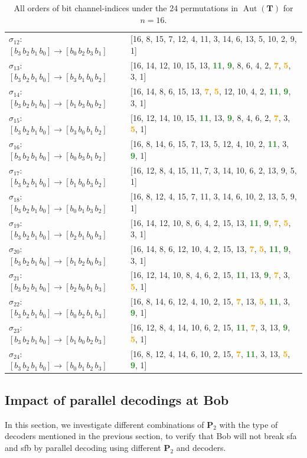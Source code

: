\documentclass[onecolumn]{IEEEtran} %
\newcommand{\bP}{\mathbf P}
\newcommand{\1}{\mathbbm{1}}
\DeclareMathOperator{\Aut}{Aut}
\theoremstyle{boldremark}
\newcommand{\bT}{\mathbf{T}}
\newcommand{\g}[1]{\textcolor{ForestGreen}{\textbf{#1}}}
\newcommand{\y}[1]{\textcolor{orange}{\textbf{#1}}}
\begin{document}
\begin{table}[h]
\begin{normalsize}
\begin{tabular}{ll}
$\sigma_{12}$: $[b_3\,b_2\,b_1\,b_0]\to[b_0\,b_2\,b_3\,b_1]$ & [16, 8, 15, 7, 12, 4, 11, 3, 14, 6, 13, 5, 10, 2, 9, 1]\\
$\sigma_{13}$: $[b_3\,b_2\,b_1\,b_0]\to[b_3\,b_1\,b_0\,b_2]$ & [16, 14, 12, 10, 15, 13, \g{11}, \g{9}, 8, 6, 4, 2, \y{7}, \y{5}, 3, 1]\\
$\sigma_{14}$: $[b_3\,b_2\,b_1\,b_0]\to[b_1\,b_3\,b_0\,b_2]$ & [16, 14, 8, 6, 15, 13, \y{7}, \y{5}, 12, 10, 4, 2, \g{11}, \g{9}, 3, 1]\\
$\sigma_{15}$: $[b_3\,b_2\,b_1\,b_0]\to[b_3\,b_0\,b_1\,b_2]$ & [16, 12, 14, 10, 15, \g{11}, 13, \g{9}, 8, 4, 6, 2, \y{7}, 3, \y{5}, 1]\\
$\sigma_{16}$: $[b_3\,b_2\,b_1\,b_0]\to[b_0\,b_3\,b_1\,b_2]$ & [16, 8, 14, 6, 15, 7, 13, 5, 12, 4, 10, 2, \g{11}, 3, \g{9}, 1]\\
$\sigma_{17}$: $[b_3\,b_2\,b_1\,b_0]\to[b_1\,b_0\,b_3\,b_2]$ & [16, 12, 8, 4, 15, 11, 7, 3, 14, 10, 6, 2, 13, 9, 5, 1]\\
$\sigma_{18}$: $[b_3\,b_2\,b_1\,b_0]\to[b_0\,b_1\,b_3\,b_2]$ & [16, 8, 12, 4, 15, 7, 11, 3, 14, 6, 10, 2, 13, 5, 9, 1]\\
$\sigma_{19}$: $[b_3\,b_2\,b_1\,b_0]\to[b_2\,b_1\,b_0\,b_3]$ & [16, 14, 12, 10, 8, 6, 4, 2, 15, 13, \g{11}, \g{9}, \y{7}, \y{5}, 3, 1]\\
$\sigma_{20}$: $[b_3\,b_2\,b_1\,b_0]\to[b_1\,b_2\,b_0\,b_3]$ & [16, 14, 8, 6, 12, 10, 4, 2, 15, 13, \y{7}, \y{5}, \g{11}, \g{9}, 3, 1]\\
$\sigma_{21}$: $[b_3\,b_2\,b_1\,b_0]\to[b_2\,b_0\,b_1\,b_3]$ & [16, 12, 14, 10, 8, 4, 6, 2, 15, \g{11}, 13, \g{9}, \y{7}, 3, \y{5}, 1]\\
$\sigma_{22}$: $[b_3\,b_2\,b_1\,b_0]\to[b_0\,b_2\,b_1\,b_3]$ & [16, 8, 14, 6, 12, 4, 10, 2, 15, \y{7}, 13, \y{5}, \g{11}, 3, \g{9}, 1]\\
$\sigma_{23}$: $[b_3\,b_2\,b_1\,b_0]\to[b_1\,b_0\,b_2\,b_3]$ & [16, 12, 8, 4, 14, 10, 6, 2, 15, \g{11}, \y{7}, 3, 13, \g{9}, \y{5}, 1]\\
$\sigma_{24}$: $[b_3\,b_2\,b_1\,b_0]\to[b_0\,b_1\,b_2\,b_3]$ & [16, 8, 12, 4, 14, 6, 10, 2, 15, \y{7}, \g{11}, 3, 13, \y{5}, \g{9}, 1]\\
\end{tabular}
\end{normalsize}
    \caption{All orders of bit channel-indices under the 24 permutations in $\Aut(\bT)$ for $n=16.$}
    \label{Table_Aut_n16}
\end{table}


\subsection{Impact of parallel decodings at Bob}
In this section, we investigate different combinations of $\bP_2$ with the type of decoders mentioned in the previous section, to verify that Bob will not break \gls{sfa} and \gls{sfb} by parallel decoding using different $\bP_2$ and decoders.
\end{document}
